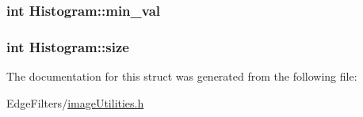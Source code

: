 \subsubsection[{min\+\_\+val}]{\setlength{\rightskip}{0pt plus 5cm}int Histogram\+::min\+\_\+val}\label{struct_histogram_aa635d0511d4e0266b109618ffb261194}
\hypertarget{struct_histogram_a9739df0cd7655cb1bbfb4313a499b851}{}
\subsubsection[{size}]{\setlength{\rightskip}{0pt plus 5cm}int Histogram\+::size}\label{struct_histogram_a9739df0cd7655cb1bbfb4313a499b851}


The documentation for this struct was generated from the following file\+:\begin{DoxyCompactItemize}
\item 
Edge\+Filters/\hyperlink{image_utilities_8h}{image\+Utilities.\+h}\end{DoxyCompactItemize}
